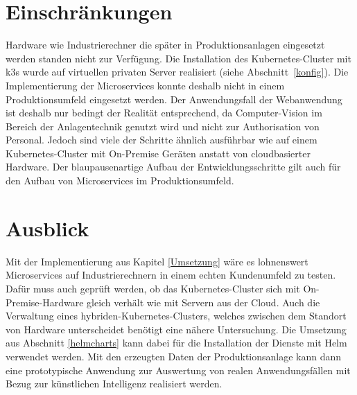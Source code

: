 \newpage

\section{Einschränkungen}\label{Einschraenkungen}
Hardware wie Industrierechner die später in Produktionsanlagen eingesetzt werden standen nicht zur Verfügung.
Die Installation des Kubernetes-Cluster mit k3s wurde auf virtuellen privaten Server realisiert (siehe Abschnitt~\ref{konfig}).
Die Implementierung der Microservices konnte deshalb nicht in einem Produktionsumfeld eingesetzt werden.
Der Anwendungsfall der Webanwendung ist deshalb nur bedingt der Realität entsprechend, da Computer-Vision im Bereich der Anlagentechnik genutzt wird und nicht zur Authorisation von Personal.
Jedoch sind viele der Schritte ähnlich ausführbar wie auf einem Kubernetes-Cluster mit On-Premise Geräten anstatt von cloudbasierter Hardware.
Der blaupausenartige Aufbau der Entwicklungsschritte gilt auch für den Aufbau von Microservices im Produktionsumfeld.

\section{Ausblick}
Mit der Implementierung aus Kapitel \ref{Umsetzung} wäre es lohnenswert Microservices auf Industrierechnern in einem echten Kundenumfeld zu testen.
Dafür muss auch geprüft werden, ob das Kubernetes-Cluster sich mit On-Premise-Hardware gleich verhält wie mit Servern aus der Cloud.
Auch die Verwaltung eines hybriden-Kubernetes-Clusters, welches zwischen dem Standort von Hardware unterscheidet benötigt eine nähere Untersuchung.
Die Umsetzung aus Abschnitt \ref{helmcharts} kann dabei für die Installation der Dienste mit Helm verwendet werden.
Mit den erzeugten Daten der Produktionsanlage kann dann eine prototypische Anwendung zur Auswertung von realen Anwendungsfällen mit Bezug zur künstlichen Intelligenz realisiert werden.


